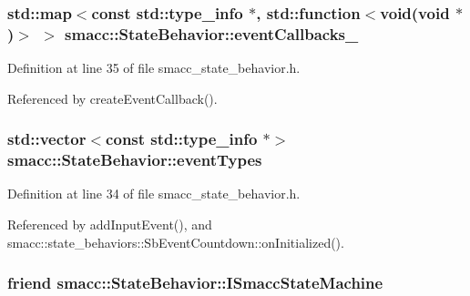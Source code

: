 \subsubsection[{\texorpdfstring{event\+Callbacks\+\_\+}{eventCallbacks_}}]{\setlength{\rightskip}{0pt plus 5cm}std\+::map$<$const std\+::type\+\_\+info $\ast$, std\+::function$<$void(void $\ast$)$>$ $>$ smacc\+::\+State\+Behavior\+::event\+Callbacks\+\_\+}\hypertarget{classsmacc_1_1StateBehavior_acbe54c0be9466094565c5b47ab53d84b}{}\label{classsmacc_1_1StateBehavior_acbe54c0be9466094565c5b47ab53d84b}


Definition at line 35 of file smacc\+\_\+state\+\_\+behavior.\+h.



Referenced by create\+Event\+Callback().

\subsubsection[{\texorpdfstring{event\+Types}{eventTypes}}]{\setlength{\rightskip}{0pt plus 5cm}std\+::vector$<$const std\+::type\+\_\+info $\ast$$>$ smacc\+::\+State\+Behavior\+::event\+Types}\hypertarget{classsmacc_1_1StateBehavior_a2df8158ebc3bb0f82c55824f088288bb}{}\label{classsmacc_1_1StateBehavior_a2df8158ebc3bb0f82c55824f088288bb}


Definition at line 34 of file smacc\+\_\+state\+\_\+behavior.\+h.



Referenced by add\+Input\+Event(), and smacc\+::state\+\_\+behaviors\+::\+Sb\+Event\+Countdown\+::on\+Initialized().

\subsubsection[{\texorpdfstring{I\+Smacc\+State\+Machine}{ISmaccStateMachine}}]{\setlength{\rightskip}{0pt plus 5cm}friend smacc\+::\+State\+Behavior\+::\+I\+Smacc\+State\+Machine\hspace{0.3cm}{\ttfamily [private]}}\hypertarget{classsmacc_1_1StateBehavior_a4bc03d3369b90283c91d7046461a554a}{}\label{classsmacc_1_1StateBehavior_a4bc03d3369b90283c91d7046461a554a}


